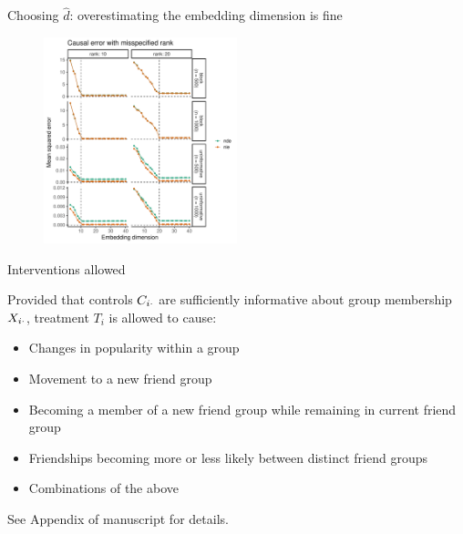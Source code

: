 \documentclass[aspectratio=169]{beamer}
\theoremstyle{remark}
\begin{document}
\begin{frame}{Choosing $\widehat{d}$: overestimating the embedding dimension is fine}

    \centering

    \begin{figure}
        \includegraphics[width=0.5\textwidth]{figures/misspecification/loss_average.pdf}
    \end{figure}

\end{frame}

\begin{frame}{Interventions allowed}

    Provided that controls $C_{i \cdot}$ are sufficiently informative about group membership $X_{i \cdot}$, treatment $T_i$ is allowed to cause:

    \begin{itemize}
        \item Changes in popularity within a group
        \item Movement to a new friend group
        \item Becoming a member of a new friend group while remaining in current friend group
        \item Friendships becoming more or less likely between distinct friend groups
        \item Combinations of the above
    \end{itemize}

    See Appendix of manuscript for details.

\end{frame}



\end{document}
